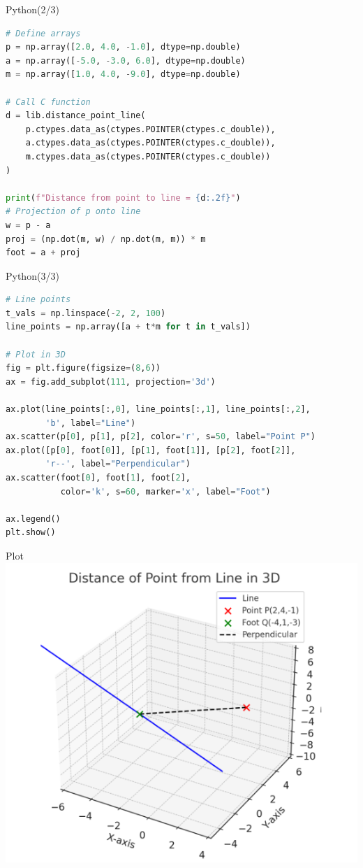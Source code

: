 \documentclass{beamer}
\begin{document}
\begin{frame}[fragile]{Python(2/3)}
\begin{lstlisting}[language=Python]
# Define arrays
p = np.array([2.0, 4.0, -1.0], dtype=np.double)
a = np.array([-5.0, -3.0, 6.0], dtype=np.double)
m = np.array([1.0, 4.0, -9.0], dtype=np.double)

# Call C function
d = lib.distance_point_line(
    p.ctypes.data_as(ctypes.POINTER(ctypes.c_double)),
    a.ctypes.data_as(ctypes.POINTER(ctypes.c_double)),
    m.ctypes.data_as(ctypes.POINTER(ctypes.c_double))
)

print(f"Distance from point to line = {d:.2f}")
# Projection of p onto line
w = p - a
proj = (np.dot(m, w) / np.dot(m, m)) * m
foot = a + proj
\end{lstlisting}
\end{frame}

\begin{frame}[fragile]{Python(3/3)}
\begin{lstlisting}[language=Python]
# Line points
t_vals = np.linspace(-2, 2, 100)
line_points = np.array([a + t*m for t in t_vals])

# Plot in 3D
fig = plt.figure(figsize=(8,6))
ax = fig.add_subplot(111, projection='3d')

ax.plot(line_points[:,0], line_points[:,1], line_points[:,2],
        'b', label="Line")
ax.scatter(p[0], p[1], p[2], color='r', s=50, label="Point P")
ax.plot([p[0], foot[0]], [p[1], foot[1]], [p[2], foot[2]],
        'r--', label="Perpendicular")
ax.scatter(foot[0], foot[1], foot[2],
           color='k', s=60, marker='x', label="Foot")

ax.legend()
plt.show()
\end{lstlisting}
\end{frame}



\begin{frame}{Plot}
\centering
\includegraphics[width=0.8\columnwidth]{figs/plot7.png}
\end{frame}
\end{document}
